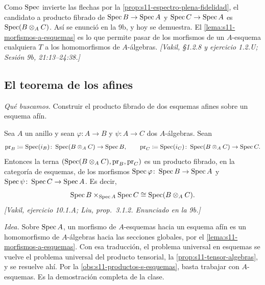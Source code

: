 Como \(\operatorname{Spec}\) invierte las flechas por la \cref{prop:s11-espectro-plena-fidelidad}, el candidato a producto fibrado de \(\operatorname{Spec} B\to\operatorname{Spec} A\) y \(\operatorname{Spec} C\to\operatorname{Spec} A\) es \(\operatorname{Spec}(B\otimes_A C)\). Así se enunció en la 9b, y hoy se demuestra. El \cref{lema:s11-morfismos-a-esquemas} es lo que permite pasar de los morfismos de un \(A\)-esquema cualquiera \(T\) a los homomorfismos de \(A\)-álgebras. \emph{[Vakil, \S1.2.8 y ejercicio 1.2.U; Sesión 9b, 21:13--24:38.]}

\subsection{El teorema de los afines}

\emph{Qué buscamos.} Construir el producto fibrado de dos esquemas afines sobre un esquema afín.

\begin{teo}
\label{teo:s11-producto-afines}
Sea \(A\) un anillo y sean \(\varphi\colon A\to B\) y \(\psi\colon A\to C\) dos \(A\)-álgebras. Sean
\[
 \mathrm{pr}_B\coloneqq\operatorname{Spec}(i_B)\colon\operatorname{Spec}(B\otimes_A C)\to\operatorname{Spec} B,\qquad
 \mathrm{pr}_C\coloneqq\operatorname{Spec}(i_C)\colon\operatorname{Spec}(B\otimes_A C)\to\operatorname{Spec} C.
\]
Entonces la terna \((\operatorname{Spec}(B\otimes_A C),\mathrm{pr}_B,\mathrm{pr}_C)\) es un producto fibrado, en la categoría de esquemas, de los morfismos \(\operatorname{Spec}\varphi\colon\operatorname{Spec} B\to\operatorname{Spec} A\) y \(\operatorname{Spec}\psi\colon\operatorname{Spec} C\to\operatorname{Spec} A\). Es decir,
\[
 \operatorname{Spec} B\times_{\operatorname{Spec} A}\operatorname{Spec} C\cong\operatorname{Spec}(B\otimes_A C).
\]
\emph{[Vakil, ejercicio 10.1.A; Liu, prop.~3.1.2. Enunciado en la 9b.]}
\end{teo}

\begin{center}
\qquad\qquad
{}
\end{center}

\emph{Idea.} Sobre \(\operatorname{Spec} A\), un morfismo de \(A\)-esquemas hacia un esquema afín es un homomorfismo de \(A\)-álgebras hacia las secciones globales, por el \cref{lema:s11-morfismos-a-esquemas}. Con esa traducción, el problema universal en esquemas se vuelve el problema universal del producto tensorial, la \cref{prop:s11-tensor-algebras}, y se resuelve ahí. Por la \cref{obs:s11-productos-s-esquemas}, basta trabajar con \(A\)-esquemas. Es la demostración completa de la clase.

